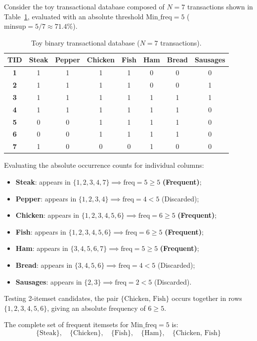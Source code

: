 \begin{example}
Consider the toy transactional database composed of $N = 7$ transactions shown in Table~\ref{tab:seq-frequent-itemsets-toy-en}, evaluated with an absolute threshold $\text{Min\_freq} = 5$ ($\text{minsup} = 5/7 \approx 71.4\%$).

\begin{table}[htbp]
\centering
\small
\renewcommand{\arraystretch}{1.2}
\begin{tabular}{c c c c c c c c}
\toprule
\textbf{TID} & \textbf{Steak} & \textbf{Pepper} & \textbf{Chicken} & \textbf{Fish} & \textbf{Ham} & \textbf{Bread} & \textbf{Sausages} \\
\midrule
\textbf{1} & 1 & 1 & 1 & 1 & 0 & 0 & 0 \\
\textbf{2} & 1 & 1 & 1 & 1 & 0 & 0 & 1 \\
\textbf{3} & 1 & 1 & 1 & 1 & 1 & 1 & 1 \\
\textbf{4} & 1 & 1 & 1 & 1 & 1 & 1 & 0 \\
\textbf{5} & 0 & 0 & 1 & 1 & 1 & 1 & 0 \\
\textbf{6} & 0 & 0 & 1 & 1 & 1 & 1 & 0 \\
\textbf{7} & 1 & 0 & 0 & 0 & 1 & 0 & 0 \\
\bottomrule
\end{tabular}
\caption{Toy binary transactional database ($N = 7$ transactions).}
\label{tab:seq-frequent-itemsets-toy-en}
\end{table}

Evaluating the absolute occurrence counts for individual columns:
\begin{itemize}[noitemsep]
    \item \textbf{Steak}: appears in $\{1, 2, 3, 4, 7\} \implies \text{freq} = 5 \ge 5$ \textbf{(Frequent)};
    \item \textbf{Pepper}: appears in $\{1, 2, 3, 4\} \implies \text{freq} = 4 < 5$ (Discarded);
    \item \textbf{Chicken}: appears in $\{1, 2, 3, 4, 5, 6\} \implies \text{freq} = 6 \ge 5$ \textbf{(Frequent)};
    \item \textbf{Fish}: appears in $\{1, 2, 3, 4, 5, 6\} \implies \text{freq} = 6 \ge 5$ \textbf{(Frequent)};
    \item \textbf{Ham}: appears in $\{3, 4, 5, 6, 7\} \implies \text{freq} = 5 \ge 5$ \textbf{(Frequent)};
    \item \textbf{Bread}: appears in $\{3, 4, 5, 6\} \implies \text{freq} = 4 < 5$ (Discarded);
    \item \textbf{Sausages}: appears in $\{2, 3\} \implies \text{freq} = 2 < 5$ (Discarded).
\end{itemize}
Testing 2-itemset candidates, the pair $\{\text{Chicken, Fish}\}$ occurs together in rows $\{1, 2, 3, 4, 5, 6\}$, giving an absolute frequency of $6 \ge 5$.

The complete set of frequent itemsets for $\text{Min\_freq} = 5$ is:
\begin{equation}
\{\text{Steak}\}, \quad \{\text{Chicken}\}, \quad \{\text{Fish}\}, \quad \{\text{Ham}\}, \quad \{\text{Chicken, Fish}\}
\end{equation}
\end{example}

